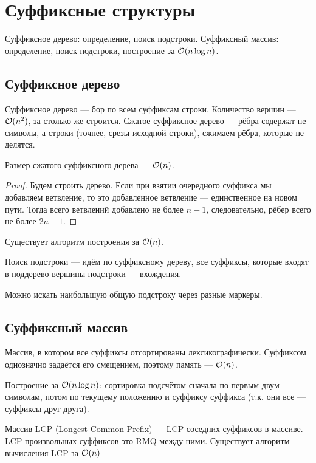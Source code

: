 \section{Суффиксные структуры}
Суффиксное дерево: определение, поиск подстроки.
Суффиксный массив: определение, поиск подстроки,
построение за $\mathcal{O}(n \log n)$.

\subsection{Суффиксное дерево}
Суффиксное дерево --- бор по всем суффиксам строки.
Количество вершин --- $\mathcal{O}(n^2)$, за столько же строится.
Сжатое суффиксное дерево --- рёбра содержат не символы,
а строки (точнее, срезы исходной строки),
сжимаем рёбра, которые не делятся.

\begin{theorem}
    Размер сжатого суффиксного дерева
    --- $\mathcal{O}(n)$.
\end{theorem}
\begin{proof}
    Будем строить дерево.
    Если при взятии очередного суффикса
    мы добавляем ветвление, то это добавленное ветвление
    --- единственное на новом пути.
    Тогда всего ветвлений добавлено не более $n - 1$,
    следовательно, рёбер всего не более $2n - 1$.
\end{proof}

Существует алгоритм построения за $\mathcal{O}(n)$.

Поиск подстроки --- идём по суффиксному дереву,
все суффиксы, которые входят в поддерево вершины подстроки
--- вхождения.

Можно искать наибольшую общую подстроку
через разные маркеры.

\subsection{Суффиксный массив}
Массив, в котором все суффиксы отсортированы лексикографически.
Суффиксом однозначно задаётся его смещением,
поэтому память --- $\mathcal{O}(n)$.

Построение за $\mathcal{O}(n \log n)$: сортировка подсчётом
сначала по первым двум символам,
потом по текущему положению и суффиксу суффикса
(т.к. они все --- суффиксы друг друга).

Массив LCP (Longest Common Prefix)
--- LCP соседних суффиксов в массиве.
LCP произвольных суффиксов это RMQ между ними.
Существует алгоритм вычисления LCP за $\mathcal{O}(n)$
